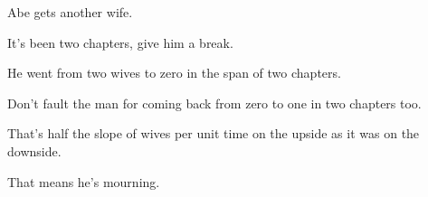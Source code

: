 

{
}
{
}
{

	Abe gets another wife.

	It's been two chapters, give him a break.

	He went from two wives to zero in the span of two chapters.

	Don't fault the man for coming back from zero to one in two chapters too.

	That's half the slope of wives per unit time on the upside as it was on the downside.

	That means he's mourning.
}

